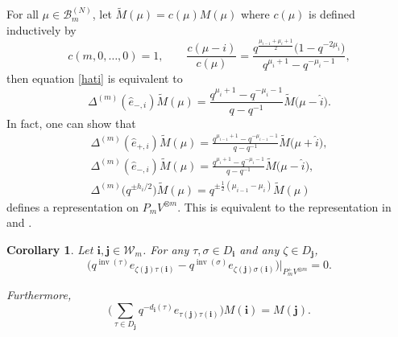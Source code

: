 \documentclass[pdftex]{sigma}
\numberwithin{equation}{section}
\newtheorem{Corollary}[Theorem]{Corollary}
\DeclareMathOperator{\inv}{inv}
\newcommand{\ii}{{\mathbf{i}}}
\newcommand{\jj}{{\mathbf{j}}}
\begin{document}
\begin{Remark}\label{ExRep}
	For all $ \mu \in \mathcal{B}^{(N)}_m $, let $ \tilde{M}(\mu)=c(\mu)M(\mu) $ where $ c(\mu) $ is defined inductively by
	\begin{equation*}%
	c(m,0,\dots,0)=1, \qquad
	\frac{c(\mu-i)}{c(\mu)}=\frac{q^{\frac{\mu_{i-1}+\mu_i+1}{2}}\big(1-q^{-2\mu_i}\big)}{q^{\mu_i+1}-q^{-\mu_i-1}} ,
	\end{equation*} then equation \eqref{hati} is equivalent to
\begin{equation*}%
	\Delta^{(m)} (\hat{e}_{-,i}) \tilde{M}(\mu) =\frac{q^{\mu_i+1}-q^{-\mu_i-1}}{q-q^{-1}} \tilde{M}\big(\mu-\hat{i}\big).
	\end{equation*} In fact, one can show that
	\begin{gather*}
		\Delta^{(m)} (\hat{e}_{+,i}) \tilde{M}(\mu) =\frac{q^{\mu_{i-1}+1}-q^{-\mu_{i-1}-1}}{q-q^{-1}} \tilde{M}\big(\mu+\hat{i}\big),\\
		\Delta^{(m)} (\hat{e}_{-,i}) \tilde{M}(\mu) =\frac{q^{\mu_i+1}-q^{-\mu_i-1}}{q-q^{-1}} \tilde{M}\big(\mu-\hat{i}\big),\\
	 \Delta^{(m)} \big(q^{\pm h_i/2}\big) \tilde{M}(\mu) =q^{\pm\frac{1}{2}(\mu_{i-1}-\mu_i)} \tilde{M}(\mu)
	\end{gather*} defines a representation on $ P_mV^{\otimes m} $. This is equivalent to the representation in \cite[equation~(3)]{KMMO} and \cite[Lemma~3.1]{KIMRN}.
\end{Remark}
\begin{Corollary}\label{Core} Let $\ii,\jj\in\mathcal{W}_m$. For any $\tau,\sigma \in D_{\ii}$ and any $\zeta \in D_{\jj}$,
\[
\big(q^{\inv(\tau)}e_{\zeta(\jj) \tau(\ii)} - q^{\inv(\sigma)}e_{\zeta(\jj) \sigma(\ii)} \big) \big|_{P_{ m}^+V^{\otimes m} } =0.
\]
	
	Furthermore,
\[
\bigg( \sum_{\tau \in D_{\jj}} q^{-d_{\ii}(\tau)}e_{\tau(\jj)\tau(\ii)} \bigg) M(\ii) = M(\jj) .
\]
\end{Corollary}
\end{document}
